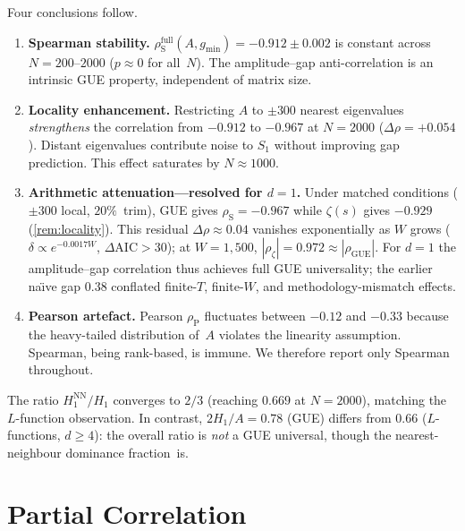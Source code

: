\documentclass[11pt,a4paper]{article}
\theoremstyle{plain}
\theoremstyle{definition}
\DeclareMathOperator{\GUE}{GUE}
\begin{document}
Four conclusions follow.

\begin{enumerate}
  \item \textbf{Spearman stability.}\;
        $\rho_{\mathrm{S}}^{\text{full}}(A,g_{\min}) = -0.912 \pm 0.002$
        is constant across $N = 200$--$2000$ ($p \approx 0$ for all~$N$).
        The amplitude--gap anti-correlation is an intrinsic GUE property,
        independent of matrix size.
  \item \textbf{Locality enhancement.}\;
        Restricting $A$ to $\pm 300$ nearest eigenvalues
        \emph{strengthens} the correlation from $-0.912$ to $-0.967$
        at $N = 2000$ ($\Delta\rho = +0.054$).  Distant eigenvalues
        contribute noise to $S_1$ without improving gap prediction.
        This effect saturates by $N \approx 1000$.
  \item \textbf{Arithmetic attenuation---resolved for $d\!=\!1$.}\;
        Under matched conditions ($\pm 300$ local, $20\%$~trim),
        GUE gives $\rho_{\mathrm{S}} = -0.967$ while $\zeta(s)$
        gives $-0.929$ (\cref{rem:locality}).
        This residual $\Delta\rho \approx 0.04$ vanishes exponentially
        as $W$ grows ($\delta \propto e^{-0.0017W}$,
        $\Delta\mathrm{AIC} > 30$); at $W = 1{,}500$,
        $|\rho_\zeta| = 0.972 \approx |\rho_{\GUE}|$.
        For $d = 1$ the amplitude--gap correlation thus achieves
        full GUE universality; the earlier na\"{\i}ve gap $0.38$
        conflated finite-$T$, finite-$W$, and methodology-mismatch
        effects.
  \item \textbf{Pearson artefact.}\;
        Pearson $\rho_{\mathrm{P}}$ fluctuates between $-0.12$ and
        $-0.33$ because the heavy-tailed distribution of~$A$
        violates the linearity assumption.  Spearman, being rank-based,
        is immune.  We therefore report only Spearman throughout.
\end{enumerate}

The ratio $H_1^{\mathrm{NN}}/H_1$ converges to $2/3$ (reaching
$0.669$ at $N = 2000$), matching the $L$-function observation.
In contrast, $2H_1/A = 0.78$ (GUE) differs from $0.66$
($L$-functions, $d \ge 4$): the overall ratio is \emph{not}
a GUE universal, though the nearest-neighbour dominance fraction~is.


\section{Partial Correlation}
\label{sec:partial}
\end{document}
